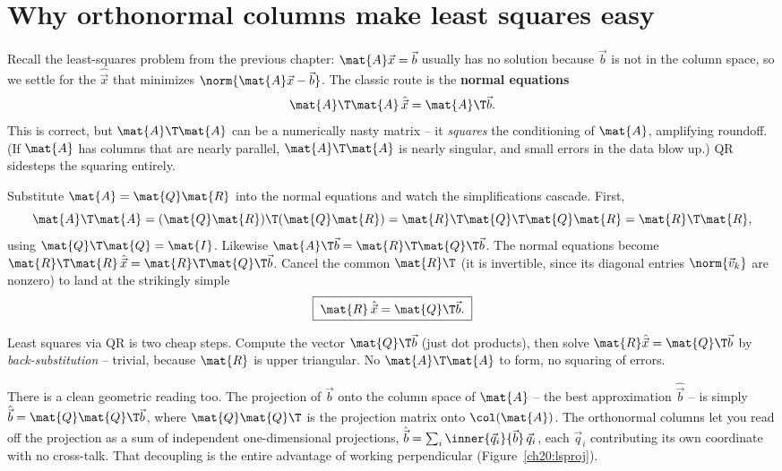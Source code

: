 \section{Why orthonormal columns make least squares easy}

Recall the least-squares problem from the previous chapter: $\mat{A}\vec{x}=\vec{b}$
usually has no solution because $\vec{b}$ is not in the column space, so we settle for
the $\hat{\vec{x}}$ that minimizes $\norm{\mat{A}\vec{x}-\vec{b}}$. The classic route
is the \textbf{normal equations}
\[
  \mat{A}\T\mat{A}\,\hat{\vec{x}} = \mat{A}\T\vec{b}.
\]
This is correct, but $\mat{A}\T\mat{A}$ can be a numerically nasty matrix -- it
\emph{squares} the conditioning of $\mat{A}$, amplifying roundoff. (If $\mat{A}$ has
columns that are nearly parallel, $\mat{A}\T\mat{A}$ is nearly singular, and small
errors in the data blow up.) QR sidesteps the squaring entirely.

Substitute $\mat{A}=\mat{Q}\mat{R}$ into the normal equations and watch the
simplifications cascade. First,
\[
  \mat{A}\T\mat{A} = (\mat{Q}\mat{R})\T(\mat{Q}\mat{R})
                   = \mat{R}\T\mat{Q}\T\mat{Q}\mat{R}
                   = \mat{R}\T\mat{R},
\]
using $\mat{Q}\T\mat{Q}=\mat{I}$. Likewise
$\mat{A}\T\vec{b}=\mat{R}\T\mat{Q}\T\vec{b}$. The normal equations become
$\mat{R}\T\mat{R}\,\hat{\vec{x}}=\mat{R}\T\mat{Q}\T\vec{b}$. Cancel the common
$\mat{R}\T$ (it is invertible, since its diagonal entries $\norm{\vec{v}_k}$ are
nonzero) to land at the strikingly simple
\[
  \boxed{\;\mat{R}\,\hat{\vec{x}} = \mat{Q}\T\vec{b}.\;}
\]

\begin{focusbox}
Least squares via QR is two cheap steps. Compute the vector $\mat{Q}\T\vec{b}$ (just
dot products), then solve $\mat{R}\hat{\vec{x}}=\mat{Q}\T\vec{b}$ by
\emph{back-substitution} -- trivial, because $\mat{R}$ is upper triangular. No
$\mat{A}\T\mat{A}$ to form, no squaring of errors.
\end{focusbox}

There is a clean geometric reading too. The projection of $\vec{b}$ onto the column
space of $\mat{A}$ -- the best approximation $\hat{\vec{b}}$ -- is simply
$\hat{\vec{b}}=\mat{Q}\mat{Q}\T\vec{b}$, where $\mat{Q}\mat{Q}\T$ is the projection
matrix onto $\col(\mat{A})$. The orthonormal columns let you read off the projection as
a sum of independent one-dimensional projections,
$\hat{\vec{b}}=\sum_i \inner{\vec{q}_i}{\vec{b}}\,\vec{q}_i$, each $\vec{q}_i$
contributing its own coordinate with no cross-talk. That decoupling is the entire
advantage of working perpendicular (Figure~\ref{ch20:lsproj}).

